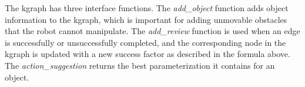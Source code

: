 The \ac{kgraph} has three interface functions. The \textit{add\_object} function adds object information to the \ac{kgraph}, which is important for adding unmovable obstacles that the robot cannot manipulate. The \textit{add\_review} function is used when an edge is successfully or unsuccessfully completed, and the corresponding node in the \ac{kgraph} is updated with a new success factor as described in the formula above. The \textit{action\_suggestion} returns the best parameterization it contains for an object.\bs
